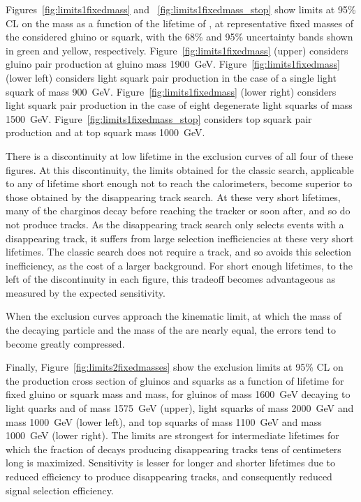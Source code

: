   Figures~\ref{fig:limits1fixedmass} and ~\ref{fig:limits1fixedmass_stop} show limits at 95\% CL on the \lsp mass as a function of the lifetime of \chargino, at representative fixed masses of the considered gluino or squark, with the 68\% and 95\% uncertainty bands shown in green and yellow, respectively.
  Figure~\ref{fig:limits1fixedmass} (upper) considers gluino pair production at gluino mass 1900~GeV.
  Figure~\ref{fig:limits1fixedmass} (lower left) considers light squark pair production in the case of a single light squark of mass 900~GeV.
  Figure~\ref{fig:limits1fixedmass} (lower right) considers light squark pair production in the case of eight degenerate light squarks of mass 1500~GeV.
  Figure~\ref{fig:limits1fixedmass_stop} considers top squark pair production and at top squark mass 1000~GeV.

  There is a discontinuity at low \chargino lifetime in the exclusion curves of all four of these figures.
  At this discontinuity, the limits obtained for the classic search, applicable to any \chargino of lifetime short enough not to reach the calorimeters, become superior to those obtained by the disappearing track search.
  At these very short lifetimes, many of the charginos decay before reaching the tracker or soon after, and so do not produce tracks.
  As the disappearing track search only selects events with a disappearing track, it suffers from large selection inefficiencies at these very short lifetimes.
  The classic search does not require a track, and so avoids this selection inefficiency, as the cost of a larger background.
  For short enough \chargino lifetimes, to the left of the discontinuity in each figure, this tradeoff becomes advantageous as measured by the expected sensitivity.

  When the exclusion curves approach the kinematic limit, at which the mass of the decaying particle and the mass of the \chargino are nearly equal, the errors tend to become greatly compressed.

  Finally, Figure~\ref{fig:limits2fixedmasses} show the exclusion limits at 95\% CL on the production cross section of gluinos and squarks as a function of \chargino lifetime for fixed gluino or squark mass and \lsp mass, for gluinos of mass 1600~GeV decaying to light quarks and \lsp of mass 1575~GeV (upper), light squarks of mass 2000~GeV and \lsp mass 1000~GeV (lower left), and top squarks of mass 1100~GeV and \lsp mass 1000~GeV (lower right).
  The limits are strongest for intermediate \chargino lifetimes for which the fraction of \chargino decays producing disappearing tracks tens of centimeters long is maximized.
  Sensitivity is lesser for longer and shorter lifetimes due to reduced efficiency to produce disappearing tracks, and consequently reduced signal selection efficiency.

